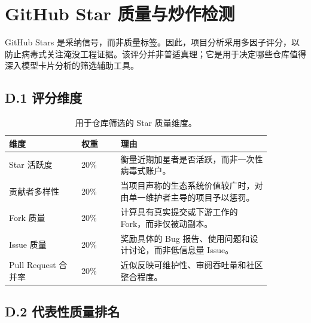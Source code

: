 \section{GitHub Star 质量与炒作检测}
\label{app:star-quality}

GitHub Stars 是采纳信号，而非质量标签。因此，项目分析采用多因子评分，以防止病毒式关注淹没工程证据。该评分并非普适真理；它是用于决定哪些仓库值得深入模型卡片分析的筛选辅助工具。

\subsection*{D.1 评分维度}

\begin{table}[t]
\centering
\TableTight
\caption{用于仓库筛选的 Star 质量维度。}
\label{tab:star-quality-dimensions}
\begin{tabular}{@{}L{0.24\linewidth}L{0.13\linewidth}L{0.50\linewidth}@{}}
\toprule
\textbf{维度} & \textbf{权重} & \textbf{理由} \\
\midrule
Star 活跃度 & 20\% & 衡量近期加星者是否活跃，而非一次性病毒式账户。 \\
贡献者多样性 & 20\% & 当项目声称的生态系统价值较广时，对由单一维护者主导的项目予以惩罚。 \\
Fork 质量 & 20\% & 计算具有真实提交或下游工作的 Fork，而非仅被动副本。 \\
Issue 质量 & 20\% & 奖励具体的 Bug 报告、使用问题和设计讨论，而非低信息量 Issue。 \\
Pull Request 合并率 & 20\% & 近似反映可维护性、审阅吞吐量和社区整合程度。 \\
\bottomrule
\end{tabular}
\end{table}

\subsection*{D.2 代表性质量排名}

